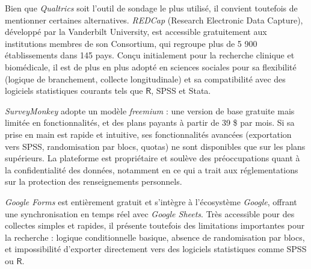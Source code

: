 \documentclass[
  letterpaper,
  DIV=11,
  numbers=noendperiod,
  oneside]{scrreprt}
\begin{document}
Bien que \emph{Qualtrics} soit l'outil de sondage le plus utilisé, il
convient toutefois de mentionner certaines alternatives. \emph{REDCap}
(Research Electronic Data Capture), développé par la Vanderbilt
University, est accessible gratuitement aux institutions membres de son
Consortium, qui regroupe plus de 5 900 établissements dans 145 pays.
Conçu initialement pour la recherche clinique et biomédicale, il est de
plus en plus adopté en sciences sociales pour sa flexibilité (logique de
branchement, collecte longitudinale) et sa compatibilité avec des
logiciels statistiques courants tels que \(\textsf{R}\), SPSS et Stata.

\emph{SurveyMonkey} adopte un modèle \emph{freemium} : une version de
base gratuite mais limitée en fonctionnalités, et des plans payants à
partir de 39 \$ par mois. Si sa prise en main est rapide et intuitive,
ses fonctionnalités avancées (exportation vers SPSS, randomisation par
blocs, quotas) ne sont disponibles que sur les plans supérieurs. La
plateforme est propriétaire et soulève des préoccupations quant à la
confidentialité des données, notamment en ce qui a trait aux
réglementations sur la protection des renseignements personnels.

\emph{Google Forms} est entièrement gratuit et s'intègre à l'écosystème
\emph{Google}, offrant une synchronisation en temps réel avec
\emph{Google Sheets}. Très accessible pour des collectes simples et
rapides, il présente toutefois des limitations importantes pour la
recherche : logique conditionnelle basique, absence de randomisation par
blocs, et impossibilité d'exporter directement vers des logiciels
statistiques comme SPSS ou \(\textsf{R}\).

\newlength\holdLTleft\newlength\holdLTright\setlength\holdLTleft{\LTleft}\relax\setlength\holdLTright{\LTright}\relax\setlength{}

\setlength{}
\end{document}

